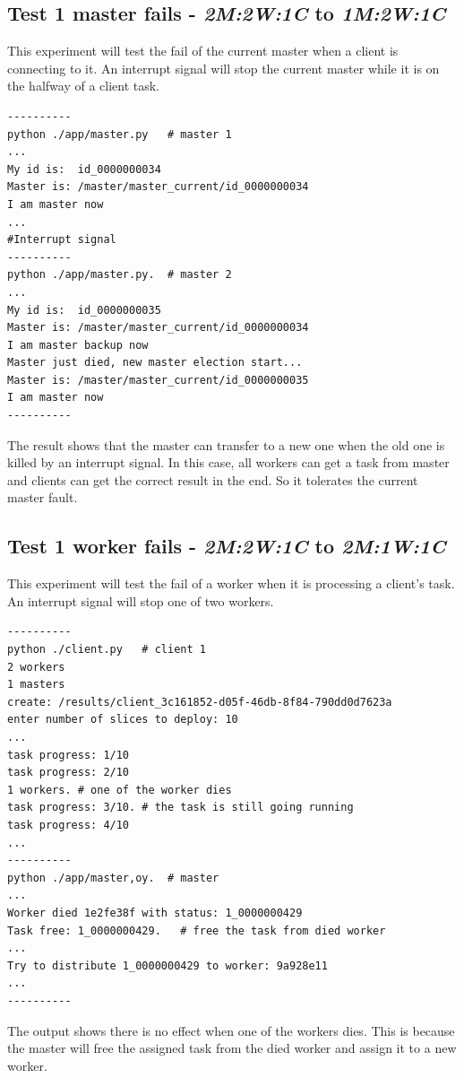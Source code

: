\documentclass[runningheads,a4paper]{llncs}
\begin{document}
\subsection{Test 1 master fails - \emph{2M:2W:1C} to \emph{1M:2W:1C}}
This experiment will test the fail of the current master when a client is connecting to it.  An interrupt signal will stop the current master while it is on the halfway of a client task.
\begin{verbatim}
----------
python ./app/master.py   # master 1
...
My id is:  id_0000000034
Master is: /master/master_current/id_0000000034
I am master now
...
#Interrupt signal
----------
python ./app/master.py.  # master 2
...
My id is:  id_0000000035
Master is: /master/master_current/id_0000000034
I am master backup now
Master just died, new master election start...
Master is: /master/master_current/id_0000000035
I am master now
----------
\end{verbatim}

The result shows that the master can transfer to a new one when the old one is killed by an interrupt signal. In this case, all workers can get a task from master and clients can get the correct result in the end. So it tolerates the current master fault.

\subsection{Test 1 worker fails - \emph{2M:2W:1C} to \emph{2M:1W:1C}}

This experiment will test the fail of a worker when it is processing a client's task.  An interrupt signal will stop one of two workers.

\begin{verbatim}
----------
python ./client.py   # client 1
2 workers
1 masters
create: /results/client_3c161852-d05f-46db-8f84-790dd0d7623a
enter number of slices to deploy: 10
...
task progress: 1/10
task progress: 2/10
1 workers. # one of the worker dies
task progress: 3/10. # the task is still going running
task progress: 4/10
...
----------
python ./app/master,oy.  # master
...
Worker died 1e2fe38f with status: 1_0000000429 
Task free: 1_0000000429.   # free the task from died worker
...
Try to distribute 1_0000000429 to worker: 9a928e11 
...
----------
\end{verbatim}

The output shows there is no effect when one of the workers dies. This is because the master will free the assigned task from the died worker and assign it to a new worker.
\end{document}

